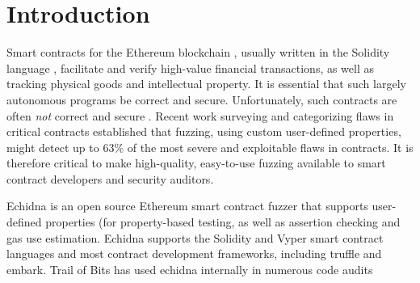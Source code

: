 \section{Introduction}

Smart contracts for the Ethereum blockchain \cite{buterin2013whitepaper}, usually written in the Solidity language \cite{wood2014yellow}, facilitate and verify high-value financial transactions, as well as tracking physical goods and intellectual property.  It is essential that such largely autonomous programs be correct and secure.  Unfortunately, such contracts are often \emph{not} correct and secure \cite{SurveyAttacks}.  Recent work surveying and categorizing flaws in critical contracts \cite{FC20} established that fuzzing, using custom user-defined properties, might detect up to 63\% of the most severe and exploitable flaws in contracts.  It is therefore critical to make high-quality, easy-to-use fuzzing available to smart contract developers and security auditors.

Echidna \cite{echidna-code} is an open source Ethereum smart contract fuzzer that supports user-defined properties (for property-based testing, as well as assertion checking and gas use estimation.  Echidna supports the Solidity and Vyper smart contract languages and most contract development frameworks, including truffle and embark. Trail of Bits has used echidna internally in numerous code audits \cite{FC20,reports}